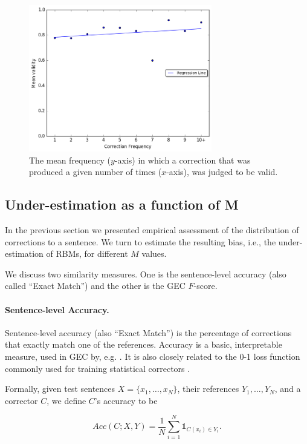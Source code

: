 \documentclass[letterpaper, 11pt]{article}
\newenvironment{myequation}{
  \vspace{-1em}
 \begin{equation}
}{
 \end{equation}
 \vspace{-1.2em}
}
\begin{document}
\begin{figure}[h!]
	\vspace{-.3cm}
	\includegraphics[width=8cm]{IAA_confirmation_frequency}
	\caption{The mean frequency ($y$-axis) in which a correction that was produced
          a given number of times ($x$-axis), was judged to be valid.
	} \label{fig:accuracy_vals}
	\vspace{-0.3cm}
\end{figure}

\subsection{Under-estimation as a function of M} \label{subsec:Assessment-values}
In the previous section we presented empirical assessment of the distribution of corrections to a sentence. We turn to estimate the resulting bias, i.e., the under-estimation of RBMs, for different $M$ values. 

We discuss two similarity measures. One is the sentence-level accuracy
(also called ``Exact Match'') and the other is the GEC $F$-score.

\paragraph{Sentence-level Accuracy.}
Sentence-level accuracy (also ``Exact Match'') is the percentage of corrections that
exactly match one of the references.
Accuracy is a basic, interpretable measure, used in GEC by, e.g. .
It is also closely related to the 0-1 loss function commonly used
for training statistical correctors \cite{chodorow2012problems,rozovskaya2013joint}. 

Formally, given test sentences $X=\{x_1,\ldots,x_N\}$,
their references $Y_1,\ldots,Y_N$, and a corrector $C$,
we define $C$'s accuracy to be

\begin{small}
\vspace{-0.2cm}
  \centering
  \begin{myequation}\label{eq:acc_def}
    Acc\left(C;X,Y\right) = \frac{1}{N} \sum_{i=1}^N \mathds{1}_{C(x_i) \in Y_i}.
  \end{myequation}
\end{small}
\end{document}
